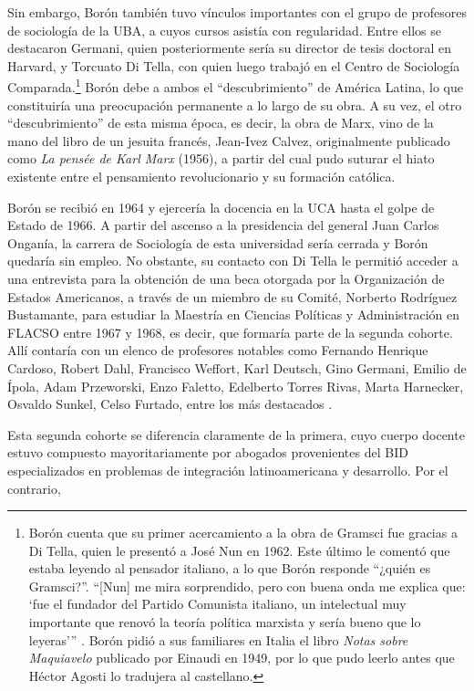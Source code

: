 {Sin embargo, Borón también tuvo vínculos importantes con el grupo de profesores de sociología de la UBA, a cuyos cursos asistía con regularidad. Entre ellos se destacaron Germani, quien posteriormente sería su director de tesis doctoral en Harvard, y Torcuato Di Tella, con quien luego trabajó en el Centro de Sociología Comparada.\footnote{Borón cuenta que su primer acercamiento a la obra de Gramsci fue gracias a Di Tella, quien le presentó a José Nun en 1962. Este último le comentó que estaba leyendo al pensador italiano, a lo que Borón responde \enquote{¿quién es Gramsci?}. \enquote{[Nun] me mira sorprendido, pero con buena onda me explica que: \enquote{fue el fundador del Partido Comunista italiano, un intelectual muy importante que renovó la teoría política marxista y sería bueno que lo leyeras}} \parencite[114]{1444-BORON2023}. Borón pidió a sus familiares en Italia el libro \emph{Notas sobre Maquiavelo} publicado por Einaudi en 1949, por lo que pudo leerlo antes que Héctor Agosti lo tradujera al castellano.} Borón debe a ambos el \enquote{descubrimiento} de América Latina, lo que constituiría una preocupación permanente a lo largo de su obra. A su vez, el otro \enquote{descubrimiento} de esta misma época, es decir, la obra de Marx, vino de la mano del libro de un jesuita francés, Jean-Ivez Calvez, originalmente publicado como \emph{La pensée de Karl Marx} (1956), a partir del cual pudo suturar el hiato existente entre el pensamiento revolucionario y su formación católica.

Borón se recibió en 1964 y ejercería la docencia en la UCA hasta el golpe de Estado de 1966. A partir del ascenso a la presidencia del general Juan Carlos Onganía, la carrera de Sociología de esta universidad sería cerrada y Borón quedaría sin empleo. No obstante, su contacto con Di Tella le permitió acceder a una entrevista para la obtención de una beca otorgada por la Organización de Estados Americanos, a través de un miembro de su Comité, Norberto Rodríguez Bustamante, para estudiar la Maestría en Ciencias Políticas y Administración en FLACSO entre 1967 y 1968, es decir, que formaría parte de la segunda cohorte. Allí contaría con un elenco de profesores notables como Fernando Henrique Cardoso, Robert Dahl, Francisco Weffort, Karl Deutsch, Gino Germani, Emilio de Ípola, Adam Przeworski, Enzo Faletto, Edelberto Torres Rivas, Marta Harnecker, Osvaldo Sunkel, Celso Furtado, entre los más destacados \parencite{1444-BORON2023}.

Esta segunda cohorte se diferencia claramente de la primera, cuyo cuerpo docente estuvo compuesto mayoritariamente por abogados provenientes del BID especializados en problemas de integración latinoamericana y desarrollo. Por el contrario,

}
